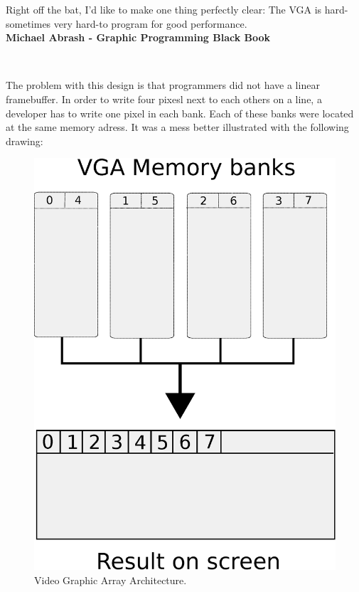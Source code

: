 \documentclass[book.tex]{subfiles}
\begin{document}
 \begin{fancyquotes}
   Right off the bat, I'd like to make one thing perfectly clear: The VGA is hard-sometimes very hard-to program for good performance.
 \bigskip \\
\textbf{Michael Abrash - Graphic Programming Black Book}
 \end{fancyquotes}
 \\
\par
The problem with this design is that programmers did not have a linear framebuffer. In order to write four pixesl next to each others on a line, a developer has to write one pixel in each bank. Each of these banks were located at the same memory adress. It was a mess better illustrated with the following drawing:\\
\par
\begin{figure}[H]
\centering
\includegraphics[width=\textwidth]{imgs/vga_ram_screen_layout.eps}
\caption{Video Graphic Array Architecture.}
\label{fig:vga_arch}
\end{figure}
\end{document}
